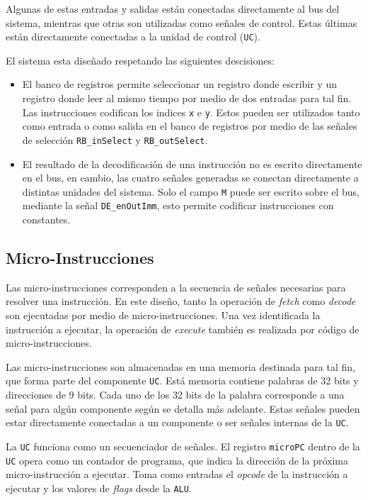 \documentclass[a4paper,11pt]{article}
\begin{document}
\normalsize

Algunas de estas entradas y salidas están conectadas directamente al bus del sistema, mientras que otras son utilizadas como señales de control.
Estas últimas están directamente conectadas a la unidad de control (\texttt{UC}).

El sistema esta diseñado respetando las siguientes descisiones:

\begin{itemize}
 \item El banco de registros permite seleccionar un registro donde escribir y un registro donde leer al mismo tiempo por medio de dos entradas para tal fin.
 Las instrucciones codifican los indices \texttt{x} e \texttt{y}. Estos pueden ser utilizados tanto como entrada o como salida en el banco de registros por medio de las señales de selección \texttt{RB\_inSelect} y \texttt{RB\_outSelect}.
 \item El resultado de la decodificación de una instrucción no es escrito directamente en el bus, en cambio, las cuatro señales generadas se conectan directamente a distintas unidades del sistema. Solo el campo \texttt{M} puede ser escrito sobre el bus, mediante la señal \texttt{DE\_enOutImm}, esto permite codificar instrucciones con constantes.
\end{itemize}

\subsection*{Micro-Instrucciones}

Las micro-instrucciones corresponden a la secuencia de señales necesarias para resolver una instrucción.
En este diseño, tanto la operación de \emph{fetch} como \emph{decode} son ejecutadas por medio de micro-instrucciones.
Una vez identificada la instrucción a ejecutar, la operación de \emph{execute} también es realizada por código de micro-instrucciones.

Las micro-instrucciones son almacenadas en una memoria destinada para tal fin, que forma parte del componente \texttt{UC}.
Está memoria contiene palabras de 32 bits y direcciones de 9 bits.
Cada uno de los 32 bits de la palabra corresponde a una señal para algún componente según se detalla más adelante.
Estas señales pueden estar directamente conectadas a un componente o ser señales internas de la \texttt{UC}.

La \texttt{UC} funciona como un secuenciador de señales.
El registro \texttt{microPC} dentro de la \texttt{UC} opera como un contador de programa, que indica la dirección de la próxima micro-instrucción a ejecutar.
Toma como entradas el \emph{opcode} de la instrucción a ejecutar y los valores de \emph{flags} desde la \texttt{ALU}.
\end{document}
